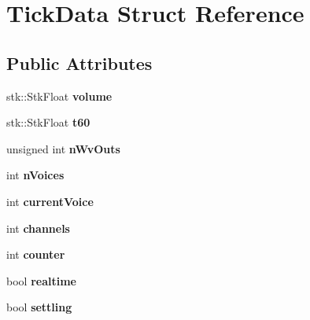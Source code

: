 \hypertarget{structTickData}{}\section{Tick\+Data Struct Reference}
\label{structTickData}
\subsection*{Public Attributes}
\begin{DoxyCompactItemize}
\item 
stk\+::\+Stk\+Float {\bfseries volume}\hypertarget{structTickData_a81bc42e25163a7afb9725153fac3d713}{}\label{structTickData_a81bc42e25163a7afb9725153fac3d713}

\item 
stk\+::\+Stk\+Float {\bfseries t60}\hypertarget{structTickData_a9916301f9f675256327e1ac0bdb8f9f4}{}\label{structTickData_a9916301f9f675256327e1ac0bdb8f9f4}

\item 
unsigned int {\bfseries n\+Wv\+Outs}\hypertarget{structTickData_abda86f5671f18f3e09fa6e0877c70bca}{}\label{structTickData_abda86f5671f18f3e09fa6e0877c70bca}

\item 
int {\bfseries n\+Voices}\hypertarget{structTickData_ac53a7ecd6dfff24019bfb607202f6024}{}\label{structTickData_ac53a7ecd6dfff24019bfb607202f6024}

\item 
int {\bfseries current\+Voice}\hypertarget{structTickData_a620ca81cff77e4cdaf0025b73bc37e61}{}\label{structTickData_a620ca81cff77e4cdaf0025b73bc37e61}

\item 
int {\bfseries channels}\hypertarget{structTickData_ad147869433dc1b3526aa9f4dbb3b4cc5}{}\label{structTickData_ad147869433dc1b3526aa9f4dbb3b4cc5}

\item 
int {\bfseries counter}\hypertarget{structTickData_a54ba17f6bb83ce8efe0758614221f026}{}\label{structTickData_a54ba17f6bb83ce8efe0758614221f026}

\item 
bool {\bfseries realtime}\hypertarget{structTickData_aa60016ecb88b0bdae8395aa7517a6f1f}{}\label{structTickData_aa60016ecb88b0bdae8395aa7517a6f1f}

\item 
bool {\bfseries settling}\hypertarget{structTickData_a4682f375c65eb79d9166933ec9c79c2b}{}\label{structTickData_a4682f375c65eb79d9166933ec9c79c2b}


\end{DoxyCompactItemize}
